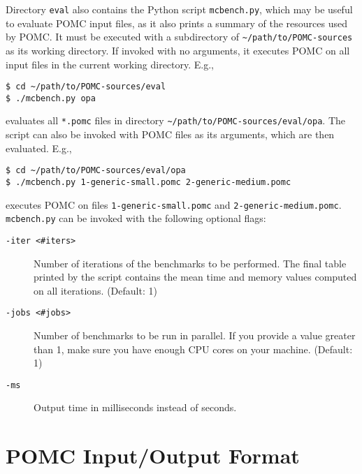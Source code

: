 \documentclass[9pt,a4paper]{article}
\begin{document}
Directory \verb|eval| also contains the Python script \verb|mcbench.py|,
which may be useful to evaluate POMC input files, as it also prints
a summary of the resources used by POMC.
It must be executed with a subdirectory of \verb|~/path/to/POMC-sources|
as its working directory.
If invoked with no arguments, it executes POMC on all input files in the current
working directory. E.g.,
\begin{verbatim}
$ cd ~/path/to/POMC-sources/eval
$ ./mcbench.py opa
\end{verbatim}
evaluates all \verb|*.pomc| files in directory \verb|~/path/to/POMC-sources/eval/opa|.
The script can also be invoked with POMC files as its arguments,
which are then evaluated. E.g.,
\begin{verbatim}
$ cd ~/path/to/POMC-sources/eval/opa
$ ./mcbench.py 1-generic-small.pomc 2-generic-medium.pomc
\end{verbatim}
executes POMC on files \verb|1-generic-small.pomc| and \verb|2-generic-medium.pomc|.
\texttt{mcbench.py} can be invoked with the following optional flags:
\begin{description}
\item[\texttt{-iter <\#iters>}]
  Number of iterations of the benchmarks to be performed.
  The final table printed by the script contains the mean time
  and memory values computed on all iterations. (Default: 1)
\item[\texttt{-jobs <\#jobs>}]
  Number of benchmarks to be run in parallel.
  If you provide a value greater than 1, make sure you have
  enough CPU cores on your machine.
  (Default: 1)
\item[\texttt{-ms}]
  Output time in milliseconds instead of seconds.
\end{description}


\section{POMC Input/Output Format}
\label{sec:format}
\end{document}
